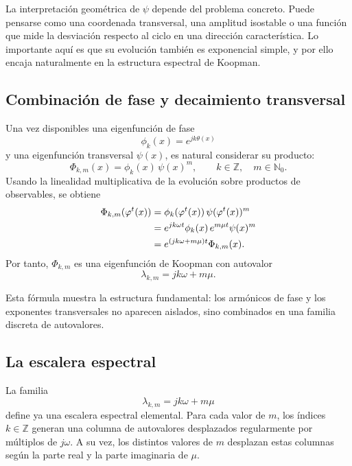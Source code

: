 La interpretación geométrica de \(\psi\) depende del problema concreto. Puede pensarse como una coordenada transversal, una amplitud isostable o una función que mide la desviación respecto al ciclo en una dirección característica. Lo importante aquí es que su evolución también es exponencial simple, y por ello encaja naturalmente en la estructura espectral de Koopman.

\subsection{Combinación de fase y decaimiento transversal}

Una vez disponibles una eigenfunción de fase
\[
\phi_k(x)=e^{jk\theta(x)}
\]
y una eigenfunción transversal \(\psi(x)\), es natural considerar su producto:
\begin{equation}
\Phi_{k,m}(x)=\phi_k(x)\,\psi(x)^m,
\qquad
k\in\mathbb{Z},\quad m\in\mathbb{N}_0.
\label{eq:Koopman_ladder_combined_observable}
\end{equation}
Usando la linealidad multiplicativa de la evolución sobre productos de observables, se obtiene
\begin{align}
\Phi_{k,m}(\varphi^t(x))
&=
\phi_k(\varphi^t(x))\,\psi(\varphi^t(x))^m \notag\\
&=
e^{jk\omega t}\phi_k(x)\,e^{m\mu t}\psi(x)^m \notag\\
&=
e^{(jk\omega+m\mu)t}\Phi_{k,m}(x).
\label{eq:Koopman_ladder_combined_evolution}
\end{align}
Por tanto, \(\Phi_{k,m}\) es una eigenfunción de Koopman con autovalor
\begin{equation}
\lambda_{k,m}=jk\omega+m\mu.
\label{eq:Koopman_ladder_combined_eigenvalue}
\end{equation}

Esta fórmula muestra la estructura fundamental: los armónicos de fase y los exponentes transversales no aparecen aislados, sino combinados en una familia discreta de autovalores.

\subsection{La escalera espectral}

La familia
\begin{equation}
\lambda_{k,m}=jk\omega+m\mu
\label{eq:Koopman_ladder_basic_family}
\end{equation}
define ya una escalera espectral elemental. Para cada valor de \(m\), los índices \(k\in\mathbb{Z}\) generan una columna de autovalores desplazados regularmente por múltiplos de \(j\omega\). A su vez, los distintos valores de \(m\) desplazan estas columnas según la parte real y la parte imaginaria de \(\mu\).

